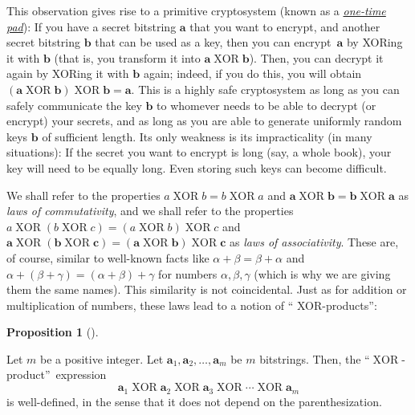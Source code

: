 \documentclass[numbers=enddot,12pt,final,onecolumn,notitlepage]{scrartcl}%
\numberwithin{exer}{subsection}
\theoremstyle{definition}
\newtheorem{prop}[theo]{Proposition}
\newenvironment{proposition}[1][]
{\begin{prop}[#1]\begin{leftbar}}
{\end{leftbar}\end{prop}}
\begin{document}
\begin{itemize}
This observation gives rise to a primitive cryptosystem (known as a
\textit{\href{https://en.wikipedia.org/wiki/One-time_pad}{\textit{one-time
pad}}}): If you have a secret bitstring $\mathbf{a}$ that you want to encrypt,
and another secret bitstring $\mathbf{b}$ that can be used as a key, then you
can encrypt\ $\mathbf{a}$ by XORing it with $\mathbf{b}$ (that is, you
transform it into $\mathbf{a}\operatorname*{XOR}\mathbf{b}$). Then, you can
decrypt it again by XORing it with $\mathbf{b}$ again; indeed, if you do this,
you will obtain $\left(  \mathbf{a}\operatorname*{XOR}\mathbf{b}\right)
\operatorname*{XOR}\mathbf{b}=\mathbf{a}$. This is a highly safe cryptosystem
as long as you can safely communicate the key $\mathbf{b}$ to whomever needs
to be able to decrypt (or encrypt) your secrets, and as long as you are able
to generate uniformly random keys $\mathbf{b}$ of sufficient length. Its only
weakness is its impracticality (in many situations): If the secret you want to
encrypt is long (say, a whole book), your key will need to be equally long.
Even storing such keys can become difficult.
\end{itemize}

We shall refer to the properties $a\operatorname*{XOR}b=b\operatorname*{XOR}a$
and $\mathbf{a}\operatorname*{XOR}\mathbf{b}=\mathbf{b}\operatorname*{XOR}%
\mathbf{a}$ as \textit{laws of commutativity}, and we shall refer to the
properties $a\operatorname*{XOR}\left(  b\operatorname*{XOR}c\right)  =\left(
a\operatorname*{XOR}b\right)  \operatorname*{XOR}c$ and $\mathbf{a}%
\operatorname*{XOR}\left(  \mathbf{b}\operatorname*{XOR}\mathbf{c}\right)
=\left(  \mathbf{a}\operatorname*{XOR}\mathbf{b}\right)  \operatorname*{XOR}%
\mathbf{c}$ as \textit{laws of associativity}. These are, of course, similar
to well-known facts like $\alpha+\beta=\beta+\alpha$ and $\alpha+\left(
\beta+\gamma\right)  =\left(  \alpha+\beta\right)  +\gamma$ for numbers
$\alpha,\beta,\gamma$ (which is why we are giving them the same names). This
similarity is not coincidental. Just as for addition or multiplication of
numbers, these laws lead to a notion of \textquotedblleft
XOR-products\textquotedblright:

\begin{proposition}
\label{prop.intro.xor.prodm}Let $m$ be a positive integer. Let $\mathbf{a}%
_{1},\mathbf{a}_{2},\ldots,\mathbf{a}_{m}$ be $m$ bitstrings. Then, the
\textquotedblleft$\operatorname*{XOR}$-product\textquotedblright\ expression%
\[
\mathbf{a}_{1}\operatorname*{XOR}\mathbf{a}_{2}\operatorname*{XOR}%
\mathbf{a}_{3}\operatorname*{XOR}\cdots\operatorname*{XOR}\mathbf{a}_{m}%
\]
is well-defined, in the sense that it does not depend on the parenthesization.
\end{proposition}
\end{document}

